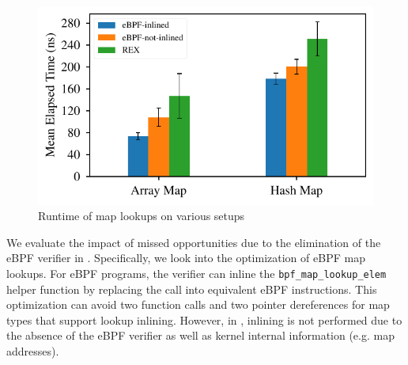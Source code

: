 \begin{figure}
    \includegraphics[width=1.0\linewidth]{figs/inline.pdf}
    \centering
    \vspace{-25pt}
    \caption{Runtime of map lookups on various setups}
    \label{fig:eval-inline}
    \vspace{-10pt}
\end{figure}


We evaluate the impact of missed opportunities due to the elimination of the
    eBPF verifier in \projname{}.
Specifically, we look into the optimization of eBPF map lookups.
For eBPF programs, the verifier can inline the \texttt{bpf\_map\_lookup\_elem}
    helper function by replacing the call into equivalent eBPF instructions.
This optimization can avoid two function calls and two pointer dereferences for
    map types that support lookup inlining.
However, in \projname{}, inlining is not performed due to the absence of the
    eBPF verifier as well as kernel internal information (e.g. map addresses).


